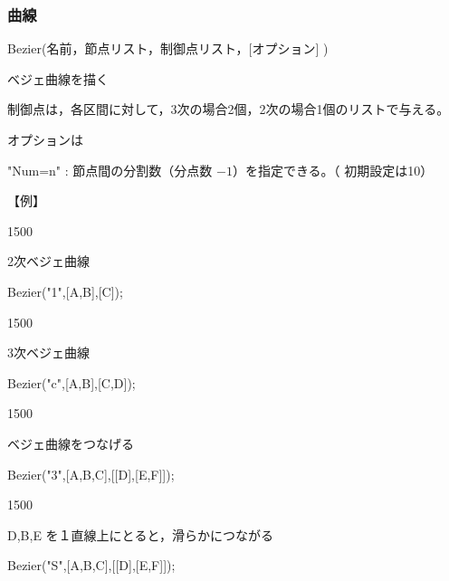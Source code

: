 \documentclass[papersize,a4paper,12pt,uplatex]{jsarticle}
\begin{document}
\subsubsection{曲線}
\begin{description}

\hypertarget{bezier}{}
\item[関数]  Bezier(名前，節点リスト，制御点リスト，[オプション] )
\item[機能]  ベジェ曲線を描く
\item[説明]  制御点は，各区間に対して，3次の場合2個，2次の場合1個のリストで与える。

オプションは

"Num=n"  : 節点間の分割数（分点数 $-1$）を指定できる。（ 初期設定は10）

\vspace{\baselineskip}
【例】

\begin{layer}{150}{0}
\end{layer}

2次ベジェ曲線

Bezier("1",[A,B],[C]);

\vspace{20mm}

\begin{layer}{150}{0}
\end{layer}

3次ベジェ曲線

Bezier("c",[A,B],[C,D]);

\vspace{20mm}

\begin{layer}{150}{0}
\end{layer}

ベジェ曲線をつなげる

Bezier("3",[A,B,C],[[D],[E,F]]);

\vspace{20mm}

\begin{layer}{150}{0}
\end{layer}

D,B,E を１直線上にとると，滑らかにつながる

Bezier("S",[A,B,C],[[D],[E,F]]);

\vspace{20mm}


\end{description}
\end{document}
